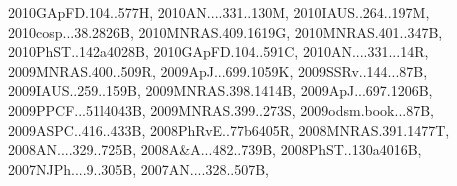 \documentclass[12pt]{article}
\begin{document}
\begin{enumerate}
\begin{enumerate}
{2010GApFD.104..577H,%
2010AN....331..130M,%
2010IAUS..264..197M,%
2010cosp...38.2826B,%
2010MNRAS.409.1619G,%
2010MNRAS.401..347B,%
2010PhST..142a4028B,%
2010GApFD.104..591C,%
2010AN....331...14R,%
2009MNRAS.400..509R,%
2009ApJ...699.1059K,%
2009SSRv..144...87B,%
2009IAUS..259..159B,%
2009MNRAS.398.1414B,%
2009ApJ...697.1206B,%
2009PPCF...51l4043B,%
2009MNRAS.399..273S,%
2009odsm.book...87B,%
2009ASPC..416..433B,%
2008PhRvE..77b6405R,%
2008MNRAS.391.1477T,%
2008AN....329..725B,%
2008A&A...482..739B,%
2008PhST..130a4016B,%
2007NJPh....9..305B,%
2007AN....328..507B,%
}
\end{enumerate}
\end{enumerate}
\end{document}
